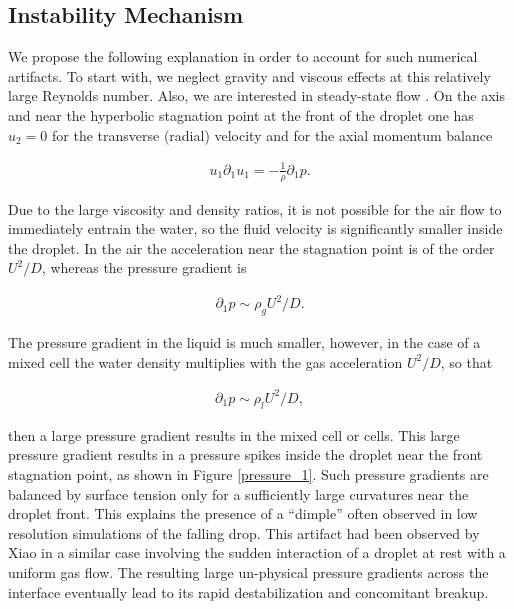 \subsection*{Instability Mechanism}

We propose the following explanation in order to account for such numerical artifacts. 
To start with, we neglect gravity and viscous effects at this relatively large Reynolds number. 
Also, we are interested in steady-state flow 
. 
On the axis and near the hyperbolic stagnation point 
at the front of the droplet one has $u_2=0$ for the transverse 
(radial) velocity and for the axial momentum balance


\begin{align}
u_1 \partial_1 u_1 = - \frac 1 \rho \partial_1 p.
\end{align}

Due to the large viscosity and density ratios, it is not possible for 
the air flow to immediately entrain the water, so the fluid velocity 
is significantly smaller inside the droplet. 
In the air the acceleration near the stagnation point is 
of the order $U^2/D$, whereas the pressure gradient is

\begin{align}
\partial_1 p \sim \rho_{g} U^2/D.
\end{align}

The pressure gradient in the liquid is much smaller, 
however, in the case of a mixed cell the water density 
multiplies with the gas acceleration $U^2/D$, so that

\begin{align}
\partial_1 p \sim \rho_{l} U^2/D,
\end{align}

then a large pressure gradient results in the mixed cell or cells. 
This large pressure gradient results in a pressure spikes inside the 
droplet near the front stagnation point, as shown in Figure \ref{pressure_1}. 
Such pressure gradients are balanced by surface tension only for a sufficiently 
large curvatures near the droplet front. 
This explains the presence of a ``dimple'' often observed in low 
resolution simulations of the falling drop. 
This artifact had been observed by Xiao \cite{xiao2012} in a similar case
involving the sudden interaction of a droplet at rest with a uniform gas flow. 
The resulting large un-physical pressure gradients across the interface 
eventually lead to its rapid destabilization and concomitant breakup.  

